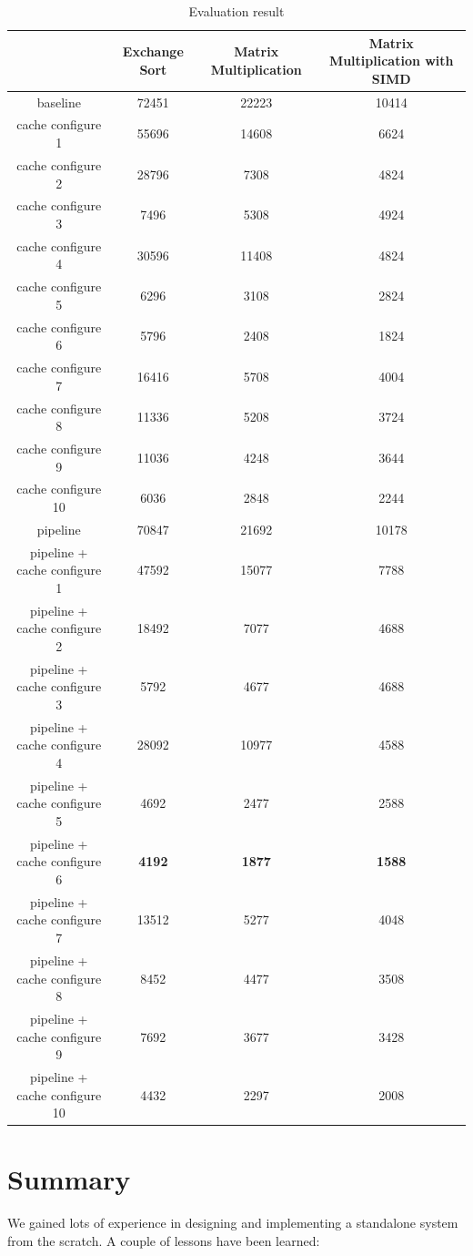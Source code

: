 \documentclass{sig-alternate}
\begin{document}
\begin{table}
\caption{Evaluation result}
\label{tab:res}
\centering
\begin{tabular}{|c|c|c|c|}
\hline
 & Exchange Sort & Matrix Multiplication & Matrix Multiplication with SIMD \\
 \hline
baseline & 72451 & 22223 & 10414 \\
\hline
cache configure 1& 55696 & 14608& 6624 \\
\hline
cache configure 2 & 28796 & 7308 & 4824\\
\hline
cache configure 3 & 7496& 5308& 4924\\
\hline
cache configure 4 & 30596& 11408& 4824\\
\hline
cache configure 5& 6296& 3108 & 2824 \\
\hline
cache configure 6 & 5796 & 2408 & 1824 \\
\hline
cache configure 7 & 16416 & 5708 & 4004\\
\hline
cache configure 8 & 11336 & 5208 & 3724\\
\hline
cache configure 9 & 11036 & 4248 & 3644 \\
\hline
cache configure 10 & 6036 & 2848 & 2244 \\
\hline
pipeline &70847 & 21692&10178 \\
\hline
pipeline + cache configure 1 & 47592 & 15077 & 7788\\
\hline 
pipeline + cache configure 2 & 18492 & 7077 & 4688\\
\hline
pipeline + cache configure 3 & 5792 & 4677 & 4688\\
\hline
pipeline + cache configure 4 & 28092 & 10977 & 4588\\
\hline
pipeline + cache configure 5 & 4692 & 2477 & 2588\\
\hline 
pipeline + cache configure 6 & \textbf{4192}& \textbf{1877} & \textbf{1588}\\
\hline
pipeline + cache configure 7 & 13512& 5277& 4048\\
\hline
pipeline + cache configure 8 & 8452& 4477& 3508\\
\hline
pipeline + cache configure 9 & 7692& 3677& 3428\\
\hline
pipeline + cache configure 10 & 4432& 2297& 2008\\
\hline
\end{tabular}
\end{table}


\section{Summary}
We gained lots of experience in designing and implementing a standalone system from the scratch. A couple of lessons have been learned:
\end{document}
